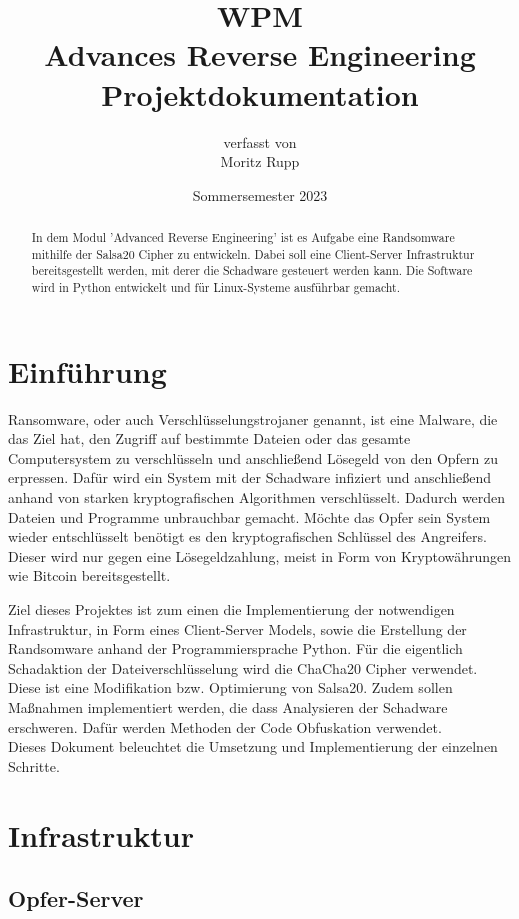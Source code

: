 \documentclass[12pt]{article}
\title{\small{WPM}\\\vspace{3mm}\Large{Advances Reverse Engineering\\\small{Projektdokumentation}}}
\author{ \small{verfasst von}\\ Moritz Rupp}
\date{Sommersemester 2023}
\begin{document}
\maketitle
\newpage
\tableofcontents
\newpage

\begin{abstract}
\noindent In dem Modul 'Advanced Reverse Engineering' ist es Aufgabe eine Randsomware mithilfe der Salsa20 Cipher zu entwickeln. Dabei soll eine Client-Server Infrastruktur bereitsgestellt werden, mit derer die Schadware gesteuert werden kann. Die Software wird in Python entwickelt und für Linux-Systeme ausführbar gemacht.
\end{abstract}
\section{Einführung}
Ransomware, oder auch Verschlüsselungstrojaner genannt, ist eine Malware, die das Ziel hat, den Zugriff auf bestimmte Dateien oder das gesamte Computersystem  zu verschlüsseln und anschließend Lösegeld von den Opfern zu erpressen. Dafür wird ein System mit der Schadware infiziert und anschließend anhand von starken kryptografischen Algorithmen verschlüsselt. Dadurch werden Dateien und Programme unbrauchbar gemacht. Möchte das Opfer sein System wieder entschlüsselt benötigt es den kryptografischen Schlüssel des Angreifers. Dieser wird nur gegen eine Lösegeldzahlung, meist in Form von Kryptowährungen wie Bitcoin bereitsgestellt. 
\newline


Ziel dieses Projektes ist zum einen die Implementierung der notwendigen Infrastruktur, in Form eines Client-Server Models, sowie die Erstellung der Randsomware anhand der Programmiersprache Python.
Für die eigentlich Schadaktion der Dateiverschlüsselung wird die ChaCha20 Cipher verwendet. Diese ist eine Modifikation bzw. Optimierung von Salsa20.
Zudem sollen Maßnahmen implementiert werden, die dass Analysieren der Schadware erschweren. Dafür werden Methoden der Code Obfuskation verwendet.\\
Dieses Dokument beleuchtet die Umsetzung und Implementierung der einzelnen Schritte.

\newpage
\section{Infrastruktur}
\subsection{Opfer-Server}
																					
\end{document}
